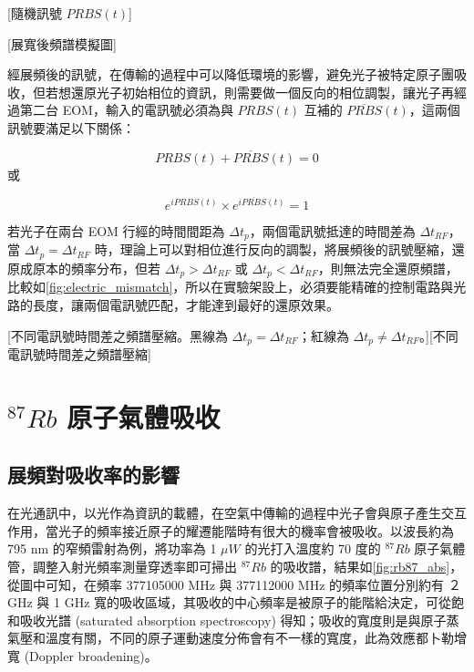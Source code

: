 \documentclass[class=NCU_thesis, crop=false]{standalone}
\begin{document}
[隨機訊號 $PRBS(t)$]

[展寬後頻譜模擬圖]

經展頻後的訊號，在傳輸的過程中可以降低環境的影響，避免光子被特定原子團吸收，但若想還原光子初始相位的資訊，則需要做一個反向的相位調製，讓光子再經過第二台 EOM，輸入的電訊號必須為與 $PRBS(t)$ 互補的 $\overline{PRBS}(t)$，這兩個訊號要滿足以下關係：

\begin{equation}
    \label{eq:prbs_condition}
    PRBS(t)+\overline{PRBS}(t)=0
\end{equation}
或

\begin{equation}
    e^{i PRBS(t)}\times e^{i \overline{PRBS}(t)}=1
\end{equation}

若光子在兩台 EOM 行經的時間間距為 $\Delta t_{p}$，兩個電訊號抵達的時間差為 $\Delta t_{RF}$，當 $\Delta t_{p}=\Delta t_{RF}$ 時，理論上可以對相位進行反向的調製，將展頻後的訊號壓縮，還原成原本的頻率分布，但若 $\Delta t_{p}>\Delta t_{RF}$ 或 $\Delta t_{p}<\Delta t_{RF}$，則無法完全還原頻譜，比較如\cref{fig:electric_mismatch}，所以在實驗架設上，必須要能精確的控制電路與光路的長度，讓兩個電訊號匹配，才能達到最好的還原效果。


[不同電訊號時間差之頻譜壓縮。黑線為 $\Delta t_{p}=\Delta t_{RF}$；紅線為 $\Delta t_{p} \neq \Delta t_{RF}$。][不同電訊號時間差之頻譜壓縮]

\section{$^{87}Rb$ 原子氣體吸收}

\subsection{展頻對吸收率的影響}
\label{section:simulation_absorption}
在光通訊中，以光作為資訊的載體，在空氣中傳輸的過程中光子會與原子產生交互作用，當光子的頻率接近原子的耀遷能階時有很大的機率會被吸收。以波長約為 795 nm 的窄頻雷射為例，將功率為 1 $\mu W$ 的光打入溫度約 70 度的 $^{87}Rb$ 原子氣體管，調整入射光頻率測量穿透率即可掃出 $^{87}Rb$ 的吸收譜，結果如\cref{fig:rb87_abs}，從圖中可知，在頻率 377105000 MHz 與 377112000 MHz 的頻率位置分別約有 ２GHz 與 1 GHz 寬的吸收區域，其吸收的中心頻率是被原子的能階給決定，可從飽和吸收光譜 (saturated absorption spectroscopy) 得知；吸收的寬度則是與原子蒸氣壓和溫度有關，不同的原子運動速度分佈會有不一樣的寬度，此為效應都卜勒增寬 (Doppler broadening)。
\end{document}
